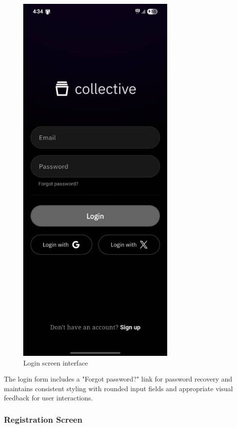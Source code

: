  \begin{figure}[H]
 \centering
 \includegraphics[width=0.7\textwidth]{files/imgs/prototype/auth_login.jpeg}
 \caption{Login screen interface}
 \label{fig:login-screen}
 \end{figure}

The login form includes a "Forgot password?" link for password recovery and maintains consistent styling with rounded input fields and appropriate visual feedback for user interactions.

\subsubsection{Registration Screen}

